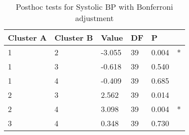 \begin{table}[h]
\caption{Posthoc tests for Systolic BP with Bonferroni adjustment}
\label{tab:posthoc_Systolic_BP}
\begin{tabular}{llllll}
\toprule
Cluster A & Cluster B & Value & DF & P &   \\
\midrule
1 & 2 & -3.055 & 39 & 0.004 & * \\
1 & 3 & -0.618 & 39 & 0.540 &   \\
1 & 4 & -0.409 & 39 & 0.685 &   \\
2 & 3 & 2.562 & 39 & 0.014 &   \\
2 & 4 & 3.098 & 39 & 0.004 & * \\
3 & 4 & 0.348 & 39 & 0.730 &   \\
\bottomrule
\end{tabular}
\end{table}
